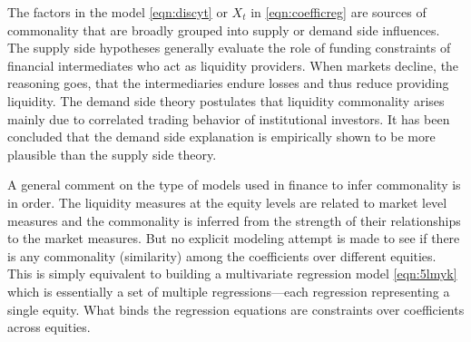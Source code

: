 The factors in the model \eqref{eqn:discyt} or $X_t$ in \eqref{eqn:coefficreg} are sources of commonality that are broadly grouped into supply or demand side influences. The supply side hypotheses generally evaluate the role of funding constraints of financial intermediates who act as liquidity providers. When markets decline, the reasoning goes, that the intermediaries endure losses and thus reduce providing liquidity. The demand side theory postulates that liquidity commonality arises mainly due to correlated trading behavior of institutional investors. It has been concluded that the demand side explanation is empirically shown to be more plausible than the supply side theory. 


A general comment on the type of models used in finance to infer commonality is in order. The liquidity measures at the equity levels are related to market level measures and the commonality is inferred from the strength of their relationships to the market measures. But no explicit modeling attempt is made to see if there is any commonality (similarity) among the coefficients over different equities. This is simply equivalent to building a multivariate regression model \eqref{eqn:5lmyk} which is essentially a set of multiple regressions---each regression representing a single equity. What binds the regression equations are constraints over coefficients across equities. 


